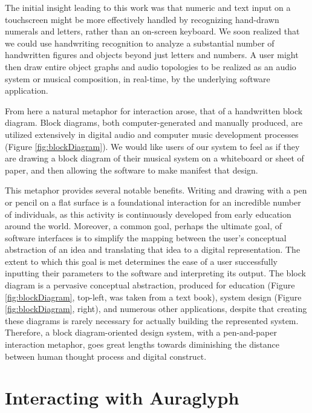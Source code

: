 \documentclass{nime-alternate}
\begin{document}
The initial insight leading to this work was that numeric and text input on a touchscreen might be more effectively handled by recognizing hand-drawn numerals and letters, rather than an on-screen keyboard. 
We soon realized that we could use handwriting recognition to analyze a substantial number of handwritten figures and objects beyond just letters and numbers. 
A user might then draw entire object graphs and audio topologies to be realized as an audio system or musical composition, in real-time, by the underlying software application. 

From here a natural metaphor for interaction arose, that of a handwritten block diagram.
Block diagrams, both computer-generated and manually produced, are utilized extensively in digital audio and computer music development processes (Figure \ref{fig:blockDiagram}). 
We would like users of our system to feel as if they are drawing a block diagram of their musical system on a whiteboard or sheet of paper, and then allowing the software to make manifest that design. 

This metaphor provides several notable benefits. 
Writing and drawing with a pen or pencil on a flat surface is a foundational interaction for an incredible number of individuals, as this activity is continuously developed from early education around the world. 
Moreover, a common goal, perhaps the ultimate goal, of software interfaces is to simplify the mapping between the user's conceptual abstraction of an idea and translating that idea to a digital representation. 
The extent to which this goal is met determines the ease of a user successfully inputting their parameters to the software and interpreting its output. 
The block diagram is a pervasive conceptual abstraction, produced for education (Figure \ref{fig:blockDiagram}, top-left, was taken from a text book), system design (Figure \ref{fig:blockDiagram}, right), and numerous other applications, despite that creating these diagrams is rarely necessary for actually building the represented system. 
Therefore, a block diagram-oriented design system, with a pen-and-paper interaction metaphor, goes great lengths towards diminishing the distance between human thought process and digital construct. 


\section{Interacting with Auraglyph}
\label{sec:SystemDescription}
\end{document}

